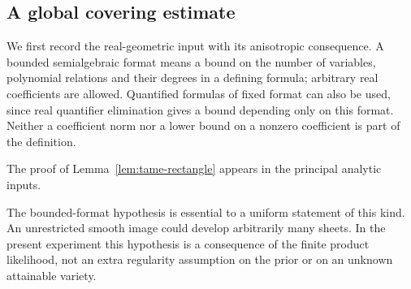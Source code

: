 \documentclass[11pt]{amsart}
\theoremstyle{definition}\newtheorem{definition}[theorem]{Definition}
\theoremstyle{remark}\newtheorem{remark}[theorem]{Remark}
\begin{document}
\subsection{A global covering estimate}
We first record the real-geometric input with its anisotropic consequence.
A bounded semialgebraic format means a bound on the number of variables,
polynomial relations and their degrees in a defining formula; arbitrary
real coefficients are allowed. Quantified formulas of fixed format can
also be used, since real quantifier elimination gives a bound depending
only on this format. Neither a coefficient norm nor a lower bound on a
nonzero coefficient is part of the definition.

The proof of Lemma~\ref{lem:tame-rectangle} appears in the principal analytic inputs.

The bounded-format hypothesis is essential to a uniform statement of
this kind. An unrestricted smooth image could develop arbitrarily many
sheets. In the present experiment this hypothesis is a consequence of
the finite product likelihood, not an extra regularity assumption on the
prior or on an unknown attainable variety.
\end{document}

